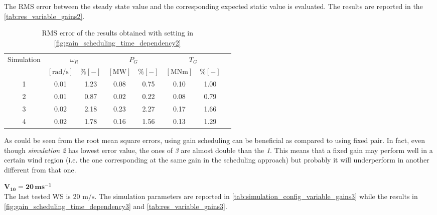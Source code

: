The \acrshort{RMS} error between the steady state value and the corresponding expected static value is evaluated. The results are reported in the \autoref{tab:res_variable_gains2}.
\begin{table}[!htbp]
  \caption{RMS error of the results obtained with setting in \autoref{fig:gain_scheduling_time_dependency2}}
  \centering
  \begin{tabular}{cccccccc}
    \toprule
      Simulation & \multicolumn{2}{c}{$\omega_R$} & \multicolumn{2}{c}{$P_G$} & \multicolumn{2}{c}{$T_G$} \\ 
       & $\left[\si{\radian\per\second}\right]$ & $ \% \left[-\right]$ & $\left[\si{\mega\watt}\right]$ & $ \% \left[-\right]$ & $\left[\si{\mega\newton\meter} \right]$ & $ \% \left[-\right]$ \\ \midrule      
     1 & 0.01 &  1.23 &  0.08  &  0.75  &  0.10  &  1.00 \\
     2 & 0.01 &  0.87 &  0.02  &  0.22  &  0.08  &  0.79 \\
     3 & 0.02 &  2.18 &  0.23  &  2.27  &  0.17  &  1.66 \\
     4 & 0.02 &  1.78 &  0.16  &  1.56  &  0.13  &  1.29 \\
    
     \bottomrule
  \end{tabular}
  \label{tab:res_variable_gains2}
\end{table}

As could be seen from the root mean square errors, using gain scheduling can be beneficial as compared to using fixed pair. In fact, even though \textit{simulation 2} has lowest error value, the ones of \textit{3} are almost double than the \textit{1}. This means that a fixed gain may perform well in a certain wind region (i.e. the one corresponding at the same gain in the scheduling approach) but probably it will underperform in another different from that one.  

$\mathbf{V_{10}=20 \, ms^{-1}}$\\
The last tested \acrshort{WS} is 20 $\si{\meter\per\second}$. The simulation parameters are reported in \autoref{tab:simulation_config_variable_gains3} while the results in \autoref{fig:gain_scheduling_time_dependency3} and \autoref{tab:res_variable_gains3}.

